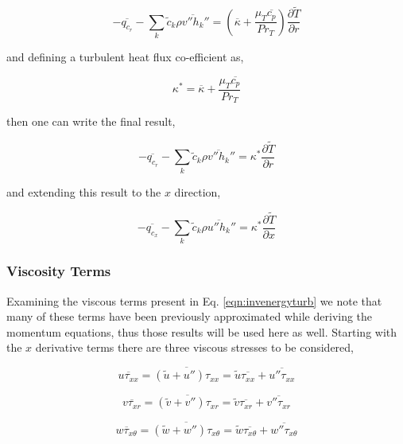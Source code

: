 \begin{displaymath}
	-\overline{q_{c_r}} - \sum_k \tilde c_k \overline{\rho v'' h_k''} = 
	(\overline{\kappa} + \frac{\mu_T \overline{c_p}}{Pr_T})\frac{\partial \tilde T}{\partial r}	
\end{displaymath}

	and defining a turbulent heat flux co-efficient as,

\begin{equation}
	\kappa^* = \overline{\kappa} +  \frac{\mu_T \overline{c_p}}{Pr_T}
\label{eqn:kappastar}
\end{equation}

	then one can write the final result,

\begin{equation}
	-\overline{q_{c_r}} - \sum_k \tilde c_k \overline{\rho v'' h_k''} = 
	\kappa^*\frac{\partial \tilde T}{\partial r}	
\label{eqn:rheatturb}
\end{equation}

	and extending this result to the $x$ direction,

\begin{equation}
	-\overline{q_{c_x}} - \sum_k \tilde c_k \overline{\rho u'' h_k''} = 
	\kappa^*\frac{\partial \tilde T}{\partial x}	
\label{eqn:xheatturb}
\end{equation}

\subsubsection{Viscosity Terms}

	Examining the viscous terms present in Eq. \ref{eqn:invenergyturb} we note that many of these
terms have been previously approximated while deriving the momentum equations, thus those results will 
be used here as well.  Starting with the $x$ derivative terms there are three viscous stresses to be considered,

\begin{displaymath}
	\overline{u \tau_{xx}} = \overline{(\tilde u + u'') \tau_{xx}} = \tilde u \overline{\tau_{xx}} + 
	\overline{u'' \tau_{xx}}
\end{displaymath}

\begin{displaymath}
	\overline{v \tau_{xr}} = \overline{(\tilde v + v'') \tau_{xr}} = \tilde v \overline{\tau_{xr}} + 
	\overline{v'' \tau_{xr}}
\end{displaymath}

\begin{displaymath}
	\overline{w \tau_{x\theta}} = \overline{(\tilde w + w'') \tau_{x\theta}} = \tilde w \overline{\tau_{x\theta}} + 
	\overline{w'' \tau_{x\theta}}
\end{displaymath}

